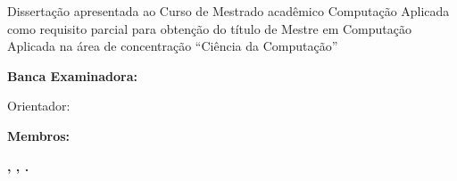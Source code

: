 %

%


\begin{folhadeaprovacao}
    \begin{center}
    \vspace*{\fill}
  	{\ABNTEXchapterfont\bfseries\Large\MakeUppercase{\imprimirautor}}
  	
  	\vspace*{\fill}
  	
    {\ABNTEXchapterfont\bfseries\Large\imprimirtitulo}
    \end{center}
    
    \vspace*{\fill}
    Dissertação apresentada ao Curso de Mestrado acadêmico Computação Aplicada como requisito parcial para obtenção do título de Mestre em Computação Aplicada na área de concentração ``Ciência da Computação''
    
    \begin{flushleft}
	\textbf{Banca Examinadora:}
	\end{flushleft}
	
    \begin{center}
	\vspace*{\fill}
	\begin{minipage}[h!]{0.35\textwidth}
	\centering
	\vspace*{-6cm}
	\begin{flushleft}
	Orientador:
	\end{flushleft}
	
	\vspace*{1cm}
	\begin{flushleft}
	\textbf{Membros:}
	\end{flushleft}

	\end{minipage}    
   	\hfill
	\begin{minipage}[h!]{0.62\textwidth}
   \end{minipage}  
   

    \vspace*{1cm}
    {\large{\textbf{\imprimirlocal , \estado, \textbf{\imprimirdata}.}}}
   \vspace*{0.1cm}
   
   \end{center}
\end{folhadeaprovacao}
